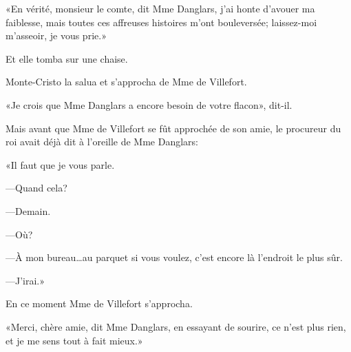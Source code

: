 «En vérité, monsieur le comte, dit Mme Danglars, j'ai honte d'avouer ma faiblesse, mais toutes ces affreuses histoires m'ont bouleversée; laissez-moi m'asseoir, je vous prie.» 

Et elle tomba sur une chaise.  

Monte-Cristo la salua et s'approcha de Mme de Villefort. 

«Je crois que Mme Danglars a encore besoin de votre flacon», dit-il. 

Mais avant que Mme de Villefort se fût approchée de son amie, le procureur du roi avait déjà dit à l'oreille de Mme Danglars: 

«Il faut que je vous parle. 

—Quand cela? 

—Demain. 

—Où? 

—À mon bureau\dots au parquet si vous voulez, c'est encore là l'endroit le plus sûr. 

—J'irai.» 

En ce moment Mme de Villefort s'approcha. 

«Merci, chère amie, dit Mme Danglars, en essayant de sourire, ce n'est plus rien, et je me sens tout à fait mieux.» 